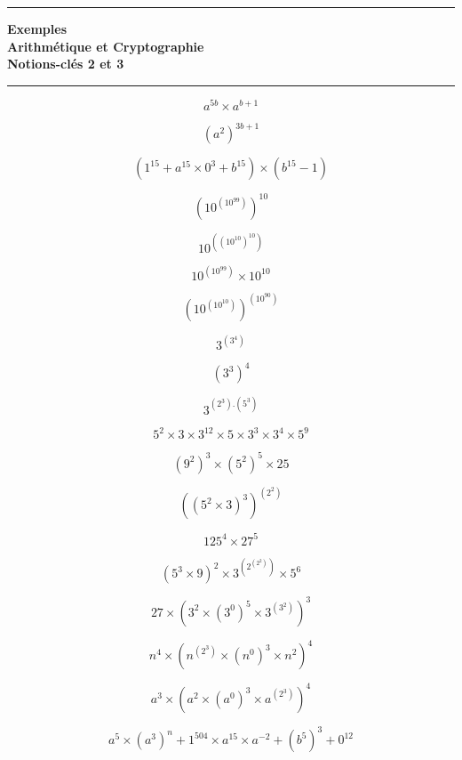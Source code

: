 \documentclass[a4paper,12pt]{article}
\theoremstyle{theorem}
\theoremstyle{definition}
\begin{document}
\vspace{.7cm}

\hrule
\vspace{.3cm}



\begin{center}

{\textbf{\Large 
Exemples\\
Arithm\'etique et Cryptographie\\
Notions-cl\'es 2 et 3}}
\vspace{.1cm}

\end{center}
\vspace{.3cm}

\hrule
\vspace{.5cm}




$$
a^{5b}\times a^{b+1}
$$

$$
(a^2)^{3b+1}
$$

$$(1^{15}+a^{15}\times0^{3}+b^{15})\times(b^{15}-1)$$


$$\left(10^{\left(10^{99}\right)}\right)^{10}$$

$$10^{\left(\left(10^{10}\right)^{10}\right)}$$

$$10^{\left(10^{99}\right)}\times10^{10}$$

$$\left(10^{\left(10^{10}\right)}\right)^{\left(10^{90}\right)}$$


$$3^{(3^4)}$$

$$(3^3)^4$$

$$3^{(2^3).(5^3)}$$


$$5^2\times3\times3^{12}\times5\times3^3\times3^4\times5^9$$

$$\left(9^2\right)^{3}\times\left(5^2\right)^{5}\times 25$$

$$\left(\left(5^2\times3\right)^3\right)^{\left(2^2\right)}$$

$$125^4\times27^5$$

$$\left(5^3\times9\right)^2\times3^{\left(2^{\left(2^2\right)}\right)}\times5^6$$


$$27\times\left(3^2\times(3^0)^5\times3^{(3^2)}\right)^3$$


$$n^4\times\left(n^{(2^3)}\times\left(n^0\right)^3\times n^2\right)^4$$


$$a^3\times\left(a^2\times(a^0)^3\times a^{(2^3)}\right)^4$$

$$a^5\times (a^3)^n+1^{504}\times a^{15}\times a^{-2} + (b^5)^3+ 0^{12}$$
\end{document}
